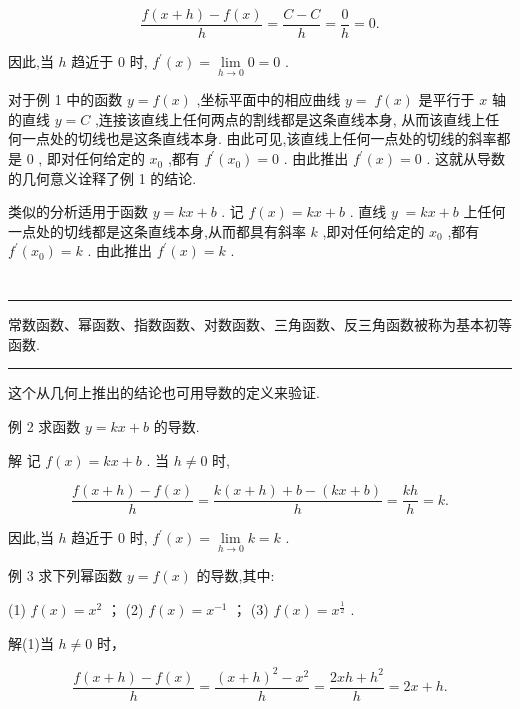 \documentclass[10pt]{article}
\newcommand{\HRule}{\begin{center}\rule{0.9\linewidth}{0.2mm}\end{center}}
\begin{document}
\[
\frac{f\left( {x + h}\right)  - f\left( x\right) }{h} = \frac{C - C}{h} = \frac{0}{h} = 0.
\]

因此,当 \(h\) 趋近于 0 时, \({f}^{\prime }\left( x\right)  = \mathop{\lim }\limits_{{h \rightarrow  0}}0 = 0\) .

对于例 1 中的函数 \(y = f\left( x\right)\) ,坐标平面中的相应曲线 \(y = \; f\left( x\right)\) 是平行于 \(x\) 轴的直线 \(y = C\) ,连接该直线上任何两点的割线都是这条直线本身, 从而该直线上任何一点处的切线也是这条直线本身. 由此可见,该直线上任何一点处的切线的斜率都是 0 , 即对任何给定的 \({x}_{0}\) ,都有 \({f}^{\prime }\left( {x}_{0}\right)  = 0\) . 由此推出 \({f}^{\prime }\left( x\right)  = 0\) . 这就从导数的几何意义诠释了例 1 的结论.

类似的分析适用于函数 \(y = {kx} + b\) . 记 \(f\left( x\right)  = {kx} + b\) . 直线 \(y \; = {kx} + b\) 上任何一点处的切线都是这条直线本身,从而都具有斜率 \(k\) ,即对任何给定的 \({x}_{0}\) ,都有 \({f}^{\prime }\left( {x}_{0}\right)  = k\) . 由此推出 \({f}^{\prime }\left( x\right)  = k\) .

\section*{}

\HRule

常数函数、幂函数、指数函数、对数函数、三角函数、反三角函数被称为基本初等函数.

\HRule

这个从几何上推出的结论也可用导数的定义来验证.

例 2 求函数 \(y = {kx} + b\) 的导数.

解 记 \(f\left( x\right)  = {kx} + b\) . 当 \(h \neq  0\) 时,

\[
\frac{f\left( {x + h}\right)  - f\left( x\right) }{h} = \frac{k\left( {x + h}\right)  + b - \left( {{kx} + b}\right) }{h} = \frac{kh}{h} = k.
\]

因此,当 \(h\) 趋近于 0 时, \({f}^{\prime }\left( x\right)  = \mathop{\lim }\limits_{{h \rightarrow  0}}k = k\) .

例 3 求下列幂函数 \(y = f\left( x\right)\) 的导数,其中:

(1) \(f\left( x\right)  = {x}^{2}\) ； (2) \(f\left( x\right)  = {x}^{-1}\) ； (3) \(f\left( x\right)  = {x}^{\frac{1}{2}}\) .

解(1)当 \(h \neq  0\) 时，

\[
\frac{f\left( {x + h}\right)  - f\left( x\right) }{h} = \frac{{\left( x + h\right) }^{2} - {x}^{2}}{h} = \frac{{2xh} + {h}^{2}}{h} = {2x} + h.
\]
\end{document}

